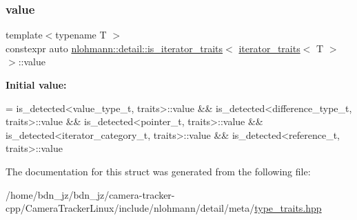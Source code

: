 \subsubsection{\texorpdfstring{value}{value}}
{\footnotesize\ttfamily template$<$typename T $>$ \\
constexpr auto \hyperlink{structnlohmann_1_1detail_1_1is__iterator__traits}{nlohmann\+::detail\+::is\+\_\+iterator\+\_\+traits}$<$ \hyperlink{structnlohmann_1_1detail_1_1iterator__traits}{iterator\+\_\+traits}$<$ T $>$ $>$\+::value\hspace{0.3cm}{\ttfamily [static]}}

{\bfseries Initial value\+:}
\begin{DoxyCode}
=
        is\_detected<value\_type\_t, traits>::value &&
        is\_detected<difference\_type\_t, traits>::value &&
        is\_detected<pointer\_t, traits>::value &&
        is\_detected<iterator\_category\_t, traits>::value &&
        is\_detected<reference\_t, traits>::value
\end{DoxyCode}


The documentation for this struct was generated from the following file\+:\begin{DoxyCompactItemize}
\item 
/home/bdn\+\_\+jz/bdn\+\_\+jz/camera-\/tracker-\/cpp/\+Camera\+Tracker\+Linux/include/nlohmann/detail/meta/\hyperlink{type__traits_8hpp}{type\+\_\+traits.\+hpp}\end{DoxyCompactItemize}
